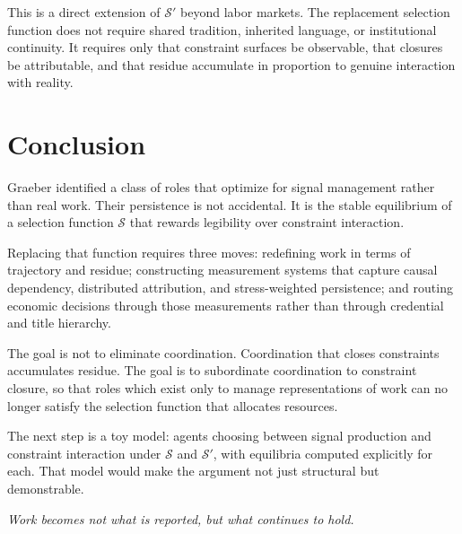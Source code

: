 \documentclass[12pt]{article}
\begin{document}
This is a direct extension of $\mathcal{S}'$ beyond labor markets. The
replacement selection function does not require shared tradition,
inherited language, or institutional continuity. It requires only that
constraint surfaces be observable, that closures be attributable, and
that residue accumulate in proportion to genuine interaction with
reality.

\section{Conclusion}

Graeber identified a class of roles that optimize for signal management
rather than real work. Their persistence is not accidental. It is the
stable equilibrium of a selection function $\mathcal{S}$ that rewards
legibility over constraint interaction.

Replacing that function requires three moves: redefining work in terms
of trajectory and residue; constructing measurement systems that capture
causal dependency, distributed attribution, and stress-weighted
persistence; and routing economic decisions through those measurements
rather than through credential and title hierarchy.

The goal is not to eliminate coordination. Coordination that closes
constraints accumulates residue. The goal is to subordinate coordination
to constraint closure, so that roles which exist only to manage
representations of work can no longer satisfy the selection function
that allocates resources.

\medskip
\noindent The next step is a toy model: agents choosing between signal
production and constraint interaction under $\mathcal{S}$ and
$\mathcal{S}'$, with equilibria computed explicitly for each. That model
would make the argument not just structural but demonstrable.

\medskip
\begin{center}
\textit{Work becomes not what is reported, but what continues to hold.}
\end{center}
\end{document}
